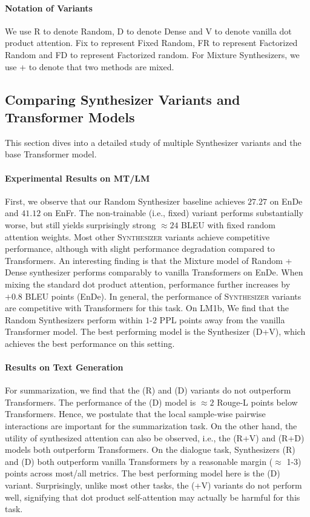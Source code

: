 \paragraph{Notation of Variants} We use R to denote Random, D to denote Dense and V to denote vanilla dot product attention. Fix to represent Fixed Random, FR to represent Factorized Random and FD to represent Factorized random. For Mixture Synthesizers, we use + to denote that two methods are mixed.

\subsection{Comparing Synthesizer Variants and Transformer Models} This section dives into a detailed study of multiple Synthesizer variants and the base Transformer model. 

\paragraph{Experimental Results on MT/LM} First, we observe that our Random Synthesizer baseline achieves $27.27$ on EnDe and $41.12$ on EnFr.  The non-trainable (i.e., fixed) variant performs substantially worse, but still yields surprisingly strong $\approx 24$ BLEU with fixed random attention weights. Most other \textsc{Synthesizer} variants achieve competitive performance, although with slight performance degradation compared to Transformers. An interesting finding is that the Mixture model of Random + Dense synthesizer performs comparably to vanilla Transformers on EnDe. When mixing the standard dot product attention, performance further increases by $+0.8$ BLEU points (EnDe). In general, the performance of \textsc{Synthesizer} variants are competitive with Transformers for this task. On LM1b, We find that the Random Synthesizers perform within $1$-$2$ PPL points away from the vanilla Transformer model. The best performing model is the Synthesizer (D+V), which achieves the best performance on this setting.

\paragraph{Results on Text Generation} For summarization, we find that the (R) and (D) variants do not outperform Transformers. The performance of the (D) model is $\approx 2$ Rouge-L points below Transformers. Hence, we postulate that the local sample-wise pairwise interactions are important for the summarization task. On the other hand, the utility of synthesized attention can also be observed, i.e., the (R+V) and (R+D) models both outperform Transformers. On the dialogue task, Synthesizers (R) and (D) both outperform vanilla Transformers by a reasonable margin ($\approx$ 1-3) points across most/all metrics. The best performing model here is the (D) variant. Surprisingly, unlike most other tasks, the (+V) variants do not perform well, signifying that dot product self-attention may actually be harmful for this task.

